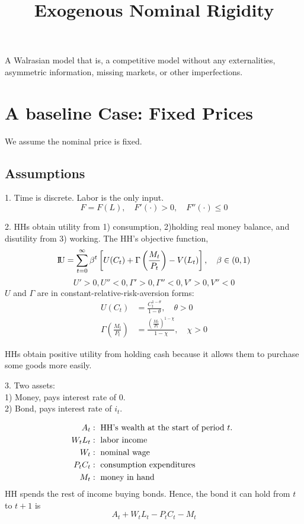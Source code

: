 \documentclass[12pt]{article}
\title{Exogenous Nominal Rigidity}
\author{}
\date{}
\begin{document}
\maketitle

A Walrasian model that is, a competitive model without any externalities,
asymmetric information, missing markets, or other imperfections.

\section{A baseline Case: Fixed Prices}
We assume the nominal price is fixed.

\subsection{Assumptions}
1. Time is discrete. Labor is the only input.
\begin{equation*}
F = F(L), \quad F'(\cdot ) > 0, \quad F''(\cdot ) \le 0
\end{equation*}

2. HHs obtain utility from 1) consumption, 2)holding real money balance, and disutility
from 3) working.
The HH's objective function,
\begin{equation*}
{\rm I\!{U}} = \sum\limits_{t = 0} ^\infty \beta^{t}	\left[ 
		U(C_{t}) + \Gamma \left( \frac{M_{t}}{P_{t}} \right)  - V(L_{t})
\right] , \quad \beta \in (0,1)
\end{equation*}
\begin{equation*}
U' > 0, U'' < 0, \Gamma' > 0, \Gamma '' < 0, V'>0, V'' < 0
\end{equation*}
$ U $ and $ \Gamma $ are in constant-relative-risk-aversion forms:
\begin{align*}
U(C_{t}) &= \frac{C_{t}^{1 - \theta}}{1 - \theta}, \quad \theta > 0\\
\Gamma \left( \frac{M_{t}}{P_{t}} \right)  &=
\frac{\left( \frac{M_{t}}{P_{t}} \right) ^{1 - \chi}}{1 - \chi}, \quad \chi > 0
\end{align*}

HHs obtain positive utility from holding cash because it allows them to purchase some
goods more easily.


3. Two assets:\\
1) Money, pays interest rate of 0.\\
2) Bond, pays interest rate of $ i_{t} $.

\begin{align*}
A_{t}&: \text{ HH's wealth at the start of period $ t $. }\\
W_{t}L_{t}&: \text{ labor income }\\
W_{t}&: \text{ nominal wage }\\
P_{t}C_{t}&: \text{ consumption expenditures }\\
M_{t}&: \text{ money in hand }
\end{align*}
HH spends the rest of income buying bonds. Hence, the bond it can hold from $ t $
to $ t + 1 $ is
\begin{equation*}
A_{t} + W_{t}L_{t} - P_{t}C_{t} - M_{t}
\end{equation*}
\end{document}
